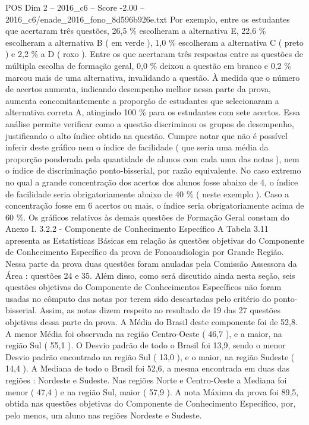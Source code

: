 \begin{textsample}{POS Dim 2 – 2016\_c6 – Score -2.00 – 2016\_c6/enade\_2016\_fono\_8d596b926e.txt}
Por exemplo, entre os estudantes que acertaram três questões, 26,5 \% escolheram a alternativa E, 22,6 \% escolheram a alternativa B ( em verde ), 1,0 \% escolheram a alternativa C ( preto ) e 2,2 \% a D ( roxo ).
Entre os que acertaram três respostas entre as questões de múltipla escolha de formação geral, 0,0 \% deixou a questão em branco e 0,2 \% marcou mais de uma alternativa, invalidando a questão.
À medida que o número de acertos aumenta, indicando desempenho melhor nessa parte da prova, aumenta concomitantemente a proporção de estudantes que selecionaram a alternativa correta A, atingindo 100 \% para os estudantes com sete acertos.
Essa análise permite verificar como a questão discriminou os grupos de desempenho, justificando o alto índice obtido na questão.
Cumpre notar que não é possível inferir deste gráfico nem o índice de facilidade ( que seria uma média da proporção ponderada pela quantidade de alunos com cada uma das notas ), nem o índice de discriminação ponto-bisserial, por razão equivalente.
No caso extremo no qual a grande concentração dos acertos dos alunos fosse abaixo de 4, o índice de facilidade seria obrigatoriamente abaixo de 40 \% ( neste exemplo ).
Caso a concentração fosse em 6 acertos ou mais, o índice seria obrigatoriamente acima de 60 \%.
Os gráficos relativos às demais questões de Formação Geral constam do Anexo I. 3.2.2 - Componente de Conhecimento Específico A Tabela 3.11 apresenta as Estatísticas Básicas em relação às questões objetivas do Componente de Conhecimento Específico da prova de Fonoaudiologia por Grande Região.
Nessa parte da prova duas questões foram anuladas pela Comissão Assessora da Área : questões 24 e 35.
Além disso, como será discutido ainda nesta seção, seis questões objetivas do Componente de Conhecimentos Específicos não foram usadas no cômputo das notas por terem sido descartadas pelo critério do ponto-bisserial.
Assim, as notas dizem respeito ao resultado de 19 das 27 questões objetivas dessa parte da prova.
A Média do Brasil deste componente foi de 52,8.
A menor Média foi observada na região Centro-Oeste ( 46,7 ), e a maior, na região Sul ( 55,1 ).
O Desvio padrão de todo o Brasil foi 13,9, sendo o menor Desvio padrão encontrado na região Sul ( 13,0 ), e o maior, na região Sudeste ( 14,4 ).
A Mediana de todo o Brasil foi 52,6, a mesma encontrada em duas das regiões : Nordeste e Sudeste.
Nas regiões Norte e Centro-Oeste a Mediana foi menor ( 47,4 ) e na região Sul, maior ( 57,9 ).
A nota Máxima da prova foi 89,5, obtida nas questões objetivas do Componente de Conhecimento Específico, por, pelo menos, um aluno nas regiões Nordeste e Sudeste.

\end{textsample}
